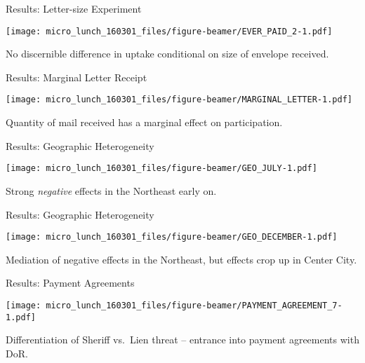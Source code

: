 \documentclass[ignorenonframetext,]{beamer}
\begin{document}
\begin{frame}{Results: Letter-size Experiment}

\texttt{[image: micro\_lunch\_160301\_files/figure-beamer/EVER\_PAID\_2-1.pdf]}

No discernible difference in uptake conditional on size of envelope
received.

\end{frame}

\begin{frame}{Results: Marginal Letter Receipt}

\texttt{[image: micro\_lunch\_160301\_files/figure-beamer/MARGINAL\_LETTER-1.pdf]}

Quantity of mail received has a marginal effect on participation.

\end{frame}

\begin{frame}{Results: Geographic Heterogeneity}

\texttt{[image: micro\_lunch\_160301\_files/figure-beamer/GEO\_JULY-1.pdf]}

Strong \emph{negative} effects in the Northeast early on.

\end{frame}

\begin{frame}{Results: Geographic Heterogeneity}

\texttt{[image: micro\_lunch\_160301\_files/figure-beamer/GEO\_DECEMBER-1.pdf]}

Mediation of negative effects in the Northeast, but effects crop up in
Center City.

\end{frame}

\begin{frame}{Results: Payment Agreements}

\texttt{[image: micro\_lunch\_160301\_files/figure-beamer/PAYMENT\_AGREEMENT\_7-1.pdf]}

Differentiation of Sheriff vs.~Lien threat -- entrance into payment
agreements with DoR.

\end{frame}
\end{document}
